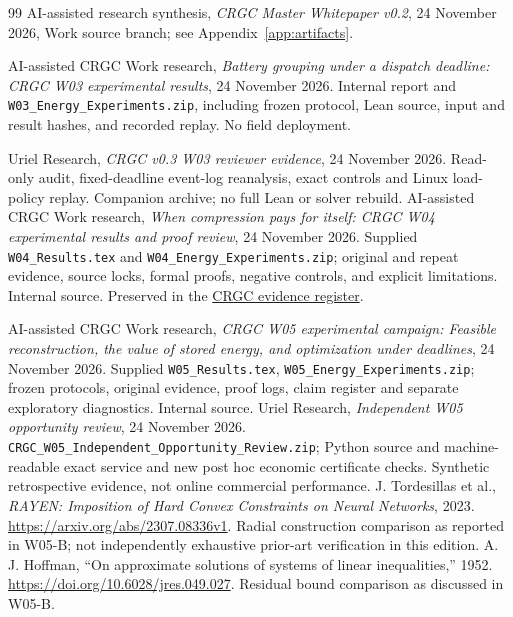 \documentclass[11pt,letterpaper]{article}
\begin{document}
\begin{thebibliography}{99}
 AI-assisted research synthesis, \emph{CRGC Master Whitepaper v0.2}, 24 November 2026, Work source branch; see Appendix~\ref{app:artifacts}.

 AI-assisted CRGC Work research, \emph{Battery grouping under a dispatch deadline: CRGC W03 experimental results}, 24 November 2026. Internal report and \texttt{W03\_Energy\_Experiments.zip}, including frozen protocol, Lean source, input and result hashes, and recorded replay. No field deployment.

 Uriel Research, \emph{CRGC v0.3 W03 reviewer evidence}, 24 November 2026. Read-only audit, fixed-deadline event-log reanalysis, exact controls and Linux load-policy replay. Companion archive; no full Lean or solver rebuild.
 AI-assisted CRGC Work research, \emph{When compression pays for itself: CRGC W04 experimental results and proof review}, 24 November 2026. Supplied \texttt{W04\_Results.tex} and \texttt{W04\_Energy\_Experiments.zip}; original and repeat evidence, source locks, formal proofs, negative controls, and explicit limitations. Internal source. Preserved in the \href{https://chatgpt.com/space/page_401978a551908191b29294e4c7019840}{CRGC evidence register}.

 AI-assisted CRGC Work research, \emph{CRGC W05 experimental campaign: Feasible reconstruction, the value of stored energy, and optimization under deadlines}, 24 November 2026. Supplied \texttt{W05\_Results.tex}, \texttt{W05\_Energy\_Experiments.zip}; frozen protocols, original evidence, proof logs, claim register and separate exploratory diagnostics. Internal source.
 Uriel Research, \emph{Independent W05 opportunity review}, 24 November 2026. \texttt{CRGC\_W05\_Independent\_Opportunity\_Review.zip}; Python source and machine-readable exact service and new post hoc economic certificate checks. Synthetic retrospective evidence, not online commercial performance.
 J. Tordesillas et al., \emph{RAYEN: Imposition of Hard Convex Constraints on Neural Networks}, 2023. \url{https://arxiv.org/abs/2307.08336v1}. Radial construction comparison as reported in W05-B; not independently exhaustive prior-art verification in this edition.
 A. J. Hoffman, ``On approximate solutions of systems of linear inequalities,'' 1952. \url{https://doi.org/10.6028/jres.049.027}. Residual bound comparison as discussed in W05-B.
\end{thebibliography}
\end{document}
